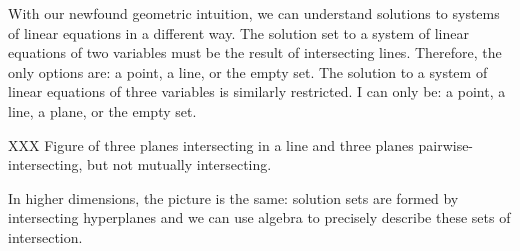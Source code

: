 	\medskip
	With our newfound geometric intuition, we can understand solutions to systems of linear equations in a different way.
	The solution set to a system of linear equations of two variables must be the result of intersecting lines. Therefore,
	the only options are: a point, a line, or the empty set. The solution to a system of linear equations of three variables
	is similarly restricted. I can only be: a point, a line, a plane, or the empty set.

	XXX Figure of three planes intersecting in a line and three planes pairwise-intersecting, but not mutually intersecting.

	In higher dimensions, the picture is the same: solution sets are formed by intersecting hyperplanes and we can use
	algebra to precisely describe these sets of intersection.
